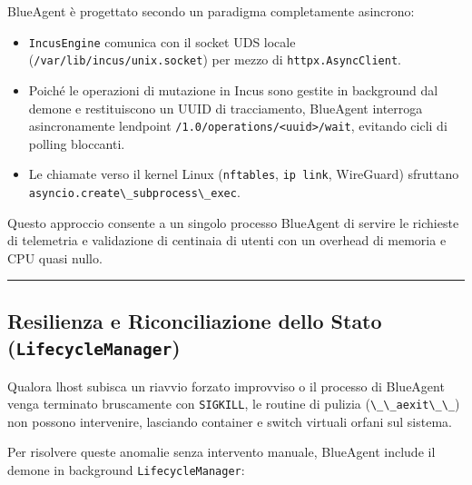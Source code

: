 BlueAgent è progettato secondo un paradigma completamente asincrono:

\begin{itemize}
\tightlist
\item
  \passthrough{\lstinline!IncusEngine!} comunica con il socket UDS
  locale (\passthrough{\lstinline!/var/lib/incus/unix.socket!}) per
  mezzo di \passthrough{\lstinline!httpx.AsyncClient!}.
\item
  Poiché le operazioni di mutazione in Incus sono gestite in background
  dal demone e restituiscono un UUID di tracciamento, BlueAgent
  interroga asincronamente l\textquotesingle endpoint
  \passthrough{\lstinline!/1.0/operations/<uuid>/wait!}, evitando cicli
  di polling bloccanti.
\item
  Le chiamate verso il kernel Linux (\passthrough{\lstinline!nftables!},
  \passthrough{\lstinline!ip link!}, WireGuard) sfruttano
  \passthrough{\lstinline!asyncio.create\_subprocess\_exec!}.
\end{itemize}

Questo approccio consente a un singolo processo BlueAgent di servire le
richieste di telemetria e validazione di centinaia di utenti con un
overhead di memoria e CPU quasi nullo.

\begin{center}\rule{0.5\linewidth}{0.5pt}\end{center}

\subsection{\texorpdfstring{Resilienza e Riconciliazione dello Stato
(\texttt{LifecycleManager})}{Resilienza e Riconciliazione dello Stato (LifecycleManager)}}\label{resilienza-e-riconciliazione-dello-stato-lifecyclemanager}

Qualora l\textquotesingle host subisca un riavvio forzato improvviso o
il processo di BlueAgent venga terminato bruscamente con
\passthrough{\lstinline!SIGKILL!}, le routine di pulizia
(\passthrough{\lstinline!\_\_aexit\_\_!}) non possono intervenire,
lasciando container e switch virtuali orfani sul sistema.

Per risolvere queste anomalie senza intervento manuale, BlueAgent
include il demone in background
\passthrough{\lstinline!LifecycleManager!}:

